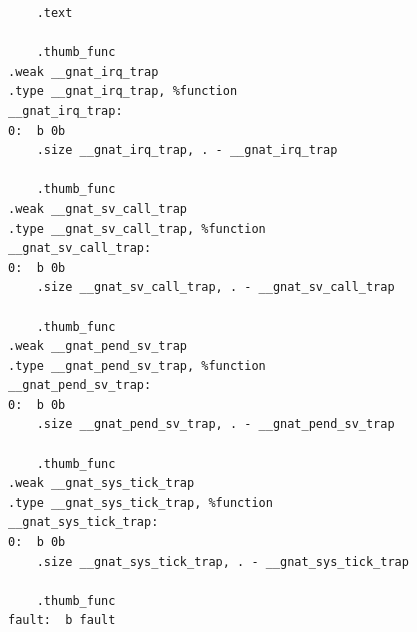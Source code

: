 \documentclass{article}
\begin{document}
\begin{lstlisting}
	.text

	.thumb_func
.weak __gnat_irq_trap
.type __gnat_irq_trap, %function
__gnat_irq_trap:
0:	b 0b
	.size __gnat_irq_trap, . - __gnat_irq_trap

	.thumb_func
.weak __gnat_sv_call_trap
.type __gnat_sv_call_trap, %function
__gnat_sv_call_trap:
0:	b 0b
	.size __gnat_sv_call_trap, . - __gnat_sv_call_trap

	.thumb_func
.weak __gnat_pend_sv_trap
.type __gnat_pend_sv_trap, %function
__gnat_pend_sv_trap:
0:	b 0b
	.size __gnat_pend_sv_trap, . - __gnat_pend_sv_trap

	.thumb_func
.weak __gnat_sys_tick_trap
.type __gnat_sys_tick_trap, %function
__gnat_sys_tick_trap:
0:	b 0b
	.size __gnat_sys_tick_trap, . - __gnat_sys_tick_trap

	.thumb_func
fault:	b fault
\end{lstlisting}
\end{document}
